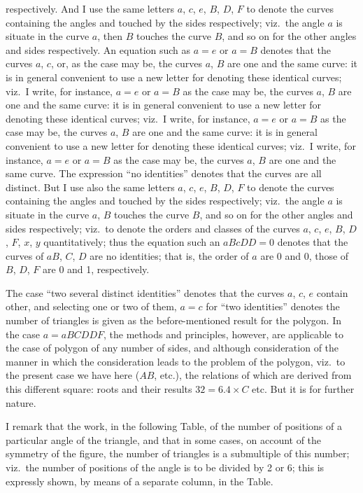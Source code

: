 \documentclass[11pt,a4paper]{article}
\begin{document}
respectively.  And I use the same letters $a$, $c$, $e$, $B$, $D$, $F$ to denote the curves containing the angles and touched by the sides respectively; viz.\ the angle $a$ is situate in the curve $a$, then $B$ touches the curve $B$, and so on for the other angles and sides respectively.  An equation such as $a = e$ or $a = B$ denotes that the curves $a$, $c$, or, as the case may be, the curves $a$, $B$ are one and the same curve: it is in general convenient to use a new letter for denoting these identical curves; viz.\ I write, for instance, $a = e$ or $a = B$ as the case may be, the curves $a$, $B$ are one and the same curve: it is in general convenient to use a new letter for denoting these identical curves; viz.\ I write, for instance, $a = e$ or $a = B$ as the case may be, the curves $a$, $B$ are one and the same curve: it is in general convenient to use a new letter for denoting these identical curves; viz.\ I write, for instance, $a = e$ or $a = B$ as the case may be, the curves $a$, $B$ are one and the same curve.  The expression ``no identities'' denotes that the curves are all distinct.  But I use also the same letters $a$, $c$, $e$, $B$, $D$, $F$ to denote the curves containing the angles and touched by the sides respectively; viz.\ the angle $a$ is situate in the curve $a$, $B$ touches the curve $B$, and so on for the other angles and sides respectively; viz.\ to denote the orders and classes of the curves $a$, $c$, $e$, $B$, $D$, $F$, $x$, $y$ quantitatively; thus the equation such an $aBcDD = 0$ denotes that the curves of $aB$, $C$, $D$ are no identities; that is, the order of $a$ are 0 and 0, those of $B$, $D$, $F$ are 0 and 1, respectively.

The case ``two several distinct identities'' denotes that the curves $a$, $c$, $e$ contain other, and selecting one or two of them, $a = c$ for ``two identities'' denotes the number of triangles is given as the before-mentioned result for the polygon. In the case $a = aBCDDF$, the methods and principles, however, are applicable to the case of polygon of any number of sides, and although consideration of the manner in which the consideration leads to the problem of the polygon, viz.\ to the present case we have here ($AB$, etc.), the relations of which are derived from this different square: roots and their results $32 = 6.4 \times C$ etc. But it is for further nature.

I remark that the work, in the following Table, of the number of positions of a particular angle of the triangle, and that in some cases, on account of the symmetry of the figure, the number of triangles is a submultiple of this number; viz.\ the number of positions of the angle is to be divided by 2 or 6; this is expressly shown, by means of a separate column, in the Table.
\end{document}
